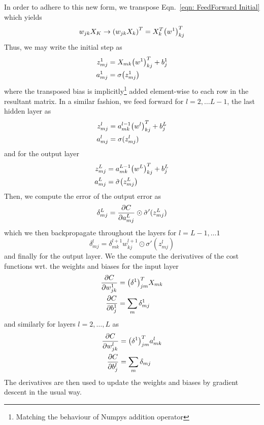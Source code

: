 \documentclass[reprint, english, nofootinbib]{revtex4-2}
\begin{document}
In order to adhere to this new form, we transpose Eqn.~\ref{eqn: FeedForward Initial} which yields
\begin{equation}
    w_{jk}X_K \rightarrow \qty(w_{jk}X_k)^T = X_k^T \qty(w^1)^T_{kj}
\end{equation}
Thus, we may write the initial step as
\begin{align}
    \begin{split}
        z^1_{mj} &= X_{mk}\qty(w^{1})^T_{kj} + b^1_j \\
        a^1_{mj} &= \sigma\qty(z^1_{mj})
    \end{split}
\end{align}
where the transposed bias is implicitly\footnote{Matching the behaviour of Numpys addition operator} added element-wise to each row in the resultant matrix. In a similar fashion, we feed forward for $l = 2, \dots L-1$, the last hidden layer as
\begin{align}
    \begin{split}
        z^l_{mj} &= a^{l-1}_{mk}\qty(w^l)^T_{kj} + b^L_j \\
        a^l_{mj} &= \sigma(z^l_{mj})
    \end{split}
\end{align}
and for the output layer
\begin{align}
    \begin{split}
        z^L_{mj} &= a^{L-1}_{mk}\qty(w^L)^T_{kj} + b^L_j \\
        a^L_{mj} &= \tilde\sigma\qty(z^L_{mj})
    \end{split}
\end{align}
Then, we compute the error of the output error as
\begin{equation}
    \delta^L_{mj} = \pdv{C}{a^L_{mj}} \odot \tilde\sigma'(z^L_{mj})
\end{equation}
which we then backpropagate throughout the layers for $l = L-1, \dots 1$
\begin{equation}
    \delta^{l}_{mj} = \delta^{l+1}_{mk}w^{l+1}_{kj} \odot \sigma'(z^l_{mj})
\end{equation}
and finally for the output layer. We the compute the derivatives of the cost functions wrt. the weights and biases for the input layer
\begin{align}
    \begin{split}
        \pdv{C}{w^{1}_{jk}} &= \qty(\delta^1)^T_{jm} X_{mk} \\
        \pdv{C}{b^1_{j}} &= \sum_m \delta^1_{mj}
    \end{split}
\end{align}
and similarly for layers $l = 2, \dots, L$ as
\begin{align}
    \begin{split}
        \pdv{C}{w^{l}_{jk}} &= \qty(\delta^1)^T_{jm} a^l_{mk} \\
        \pdv{C}{b^l_{j}} &= \sum_m \delta_{mj}
    \end{split}
\end{align}
The derivatives are then used to update the weights and biases by gradient descent in the usual way.
\end{document}
